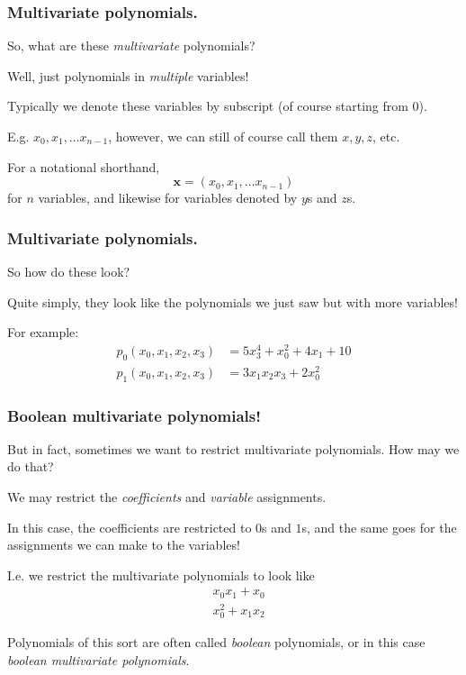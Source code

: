 \documentclass{beamer}
\begin{document}
\begin{frame}
    \frametitle{Multivariate polynomials.}
    So, what are these \textit{multivariate} polynomials?
    
    \pause 

    Well, just polynomials in \textit{multiple} variables!

    \pause 

    Typically we denote these variables by subscript (of course starting from $0$).

    E.g. $x_0, x_1, \dots x_{n - 1}$, however, we can still of course call them $x, y, z$, etc.

    \pause 

    For a notational shorthand, 
    $$
        \mathbf{x} = (x_0, x_1, \dots x_{n - 1})
    $$ 
    for $n$ variables, and likewise for variables denoted by $y$s and $z$s.
\end{frame}

\begin{frame}
    \frametitle{Multivariate polynomials.}
    So how do these look?

    \pause 

    Quite simply, they look like the polynomials we just saw but with more variables!

    \pause 
    For example:
    \begin{equation*}
        \begin{split}
            p_0(x_0, x_1, x_2, x_3) &= 5x_3^4 + x_0^2 + 4x_1 + 10\\
            p_1(x_0, x_1, x_2, x_3) &= 3x_1x_2x_3 + 2x_0^2
        \end{split}
    \end{equation*}
\end{frame}

\begin{frame}
    \frametitle{Boolean multivariate polynomials!}
    But in fact, sometimes we want to restrict multivariate polynomials. How may we do that?

    \pause 

    We may restrict the \textit{coefficients} and \textit{variable} assignments.
    
    In this case, the coefficients are restricted to $0$s and $1$s, and the same goes for the assignments we can make to the variables!

    \pause 

    I.e. we restrict the multivariate polynomials to look like 
    \begin{equation*}
        \begin{split}
            &x_0x_1 + x_0\\
            &x_0^2 + x_1x_2
        \end{split}
    \end{equation*}
    \pause 
    
    Polynomials of this sort are often called \textit{boolean} polynomials, or in this case \textit{boolean multivariate polynomials}.
\end{frame}
\end{document}

